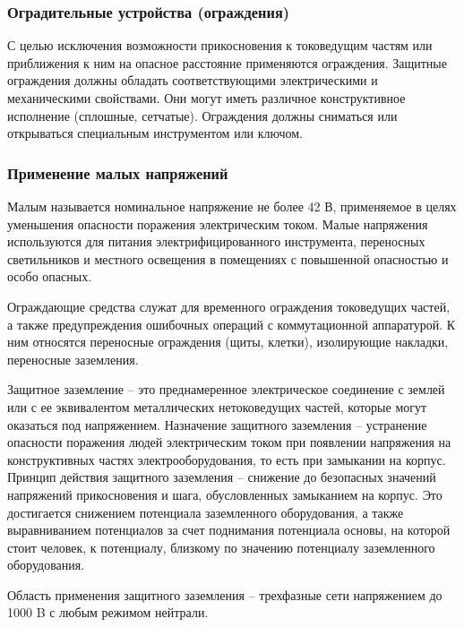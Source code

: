     \subsubsection{Оградительные устройства (ограждения)}

        С целью исключения возможности прикосновения к токоведущим частям или
        приближения к ним на опасное расстояние применяются ограждения.
        Защитные ограждения должны обладать соответствующими электрическими и
        механическими свойствами. Они могут иметь различное конструктивное
        исполнение (сплошные, сетчатые). Ограждения должны сниматься или
        открываться специальным инструментом или ключом.

    \subsubsection{Применение малых напряжений}

        Малым называется номинальное напряжение не более 42 В, применяемое в
        целях уменьшения опасности поражения электрическим током. Малые
        напряжения используются для питания электрифицированного инструмента,
        переносных светильников и местного освещения в помещениях с повышенной
        опасностью и особо опасных.

        Ограждающие средства служат для временного ограждения токоведущих
        частей, а также предупреждения ошибочных операций с коммутационной
        аппаратурой. К ним относятся переносные ограждения (щиты, клетки),
        изолирующие накладки, переносные заземления.

        Защитное заземление – это преднамеренное электрическое соединение с
        землей или с ее эквивалентом металлических нетоковедущих частей,
        которые могут оказаться под напряжением. Назначение защитного
        заземления – устранение опасности поражения людей электрическим током
        при появлении напряжения на конструктивных частях электрооборудования,
        то есть при замыкании на корпус.  Принцип действия защитного заземления
        – снижение до безопасных значений напряжений прикосновения и шага,
        обусловленных замыканием  на  корпус.  Это достигается  снижением
        потенциала заземленного оборудования, а также выравниванием потенциалов
        за счет поднимания потенциала основы, на которой стоит человек, к
        потенциалу, близкому по значению  потенциалу заземленного оборудования.

        Область применения защитного заземления – трехфазные сети напряжением
        до  1000 B с любым режимом нейтрали.

